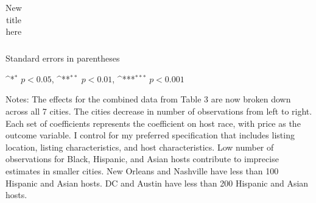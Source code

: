 



\begin{table}[htbp]\centering
	\def\sym#1{\ifmmode^{#1}\else\(^{#1}\)\fi}
	\caption{New title here}
	\label{table:robustcity_new}
	\begin{tabular}{c|ccccccc}
		\toprule
		
		
		
		\bottomrule
	\end{tabular}
	
	\begin{tablenotes}
		\item \footnotesize Standard errors in parentheses
		\item \footnotesize \sym{*} \(p<0.05\), \sym{**} \(p<0.01\), \sym{***} \(p<0.001\)
		
		\item Notes: The effects for the combined data from Table 3 are now broken down across all 7 cities. The cities decrease in number of observations from left to right. Each set of coefficients represents the coefficient on host race, with price as the outcome variable. I control for my preferred specification that includes listing location, listing characteristics, and host characteristics. Low number of observations for Black, Hispanic, and Asian hosts contribute to imprecise estimates in smaller cities. New Orleans and Nashville have less than 100 Hispanic and Asian hosts. DC and Austin have less than 200 Hispanic and Asian hosts. \end{tablenotes}
\end{table}







